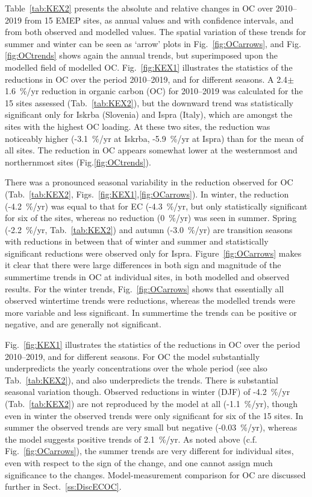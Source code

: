  Table~\ref{tab:KEX2} presents the absolute and relative changes in OC over 2010--2019 from 15 EMEP sites, as annual values and with confidence intervals, and from both observed and modelled values. The spatial variation of these trends for summer and winter can be seen as `arrow' plots in Fig.~\ref{fig:OCarrows}, and Fig.\ref{fig:OCtrends} shows again the annual trends, but superimposed upon the modelled field of modelled OC.
Fig.~\ref{fig:KEX1} illustrates the statistics of the reductions in OC  over the period 2010--2019, and for different seasons. 
A 2.4$\pm$1.6~\%/yr reduction
  in organic carbon (OC) for 2010--2019
was calculated for the 15 sites assessed (Tab.~\ref{tab:KEX2}), but the
downward trend was statistically significant only for Iskrba (Slovenia)
and Ispra (Italy), which are amongst the sites with the highest OC
loading. At these two sites, the reduction was noticeably higher 
(-3.1~\%/yr at Iskrba, -5.9~\%/yr at Ispra) than for the mean of all sites. The
reduction in OC appears somewhat lower at the westernmost and northernmost
sites (Fig.\ref{fig:OCtrends}). 




There was a pronounced seasonal variability in the reduction observed for
OC (Tab.~\ref{tab:KEX2}, Figs.~\ref{fig:KEX1},\ref{fig:OCarrows}). In winter, the
 reduction (-4.2~\%/yr) was equal to that for
EC (-4.3~\%/yr, but only statistically significant for six of the sites,
whereas no reduction (0~\%/yr) was seen in summer. Spring (-2.2~\%/yr, Tab.~\ref{tab:KEX2}) and autumn (-3.0~\%/yr) are transition seasons with reductions in between
that of winter and summer and statistically significant reductions were
observed only for Ispra. 
%
Figure~\ref{fig:OCarrows} makes it clear that there were large differences in both sign and magnitude of the summertime trends in OC at individual sites, in both modelled and observed results. For the winter trends, Fig.~\ref{fig:OCarrows} shows that essentially all observed wintertime trends were reductions, whereas the modelled trends were more variable and less significant. In summertime the trends can be positive or negative, and are generally not significant.


Fig.~\ref{fig:KEX1} illustrates the statistics of the reductions in OC  over the period 2010--2019, and for different seasons. For OC the model substantially underpredicts the yearly concentrations over the whole period (see also Tab.~\ref{tab:KEX2}), and also underpredicts the trends. There is substantial seasonal variation though. Observed reductions in winter (DJF) of -4.2~\%/yr (Tab.~\ref{tab:KEX2}) are not reproduced by the model at all (-1.1~\%/yr), though even in winter the observed trends were only significant for six of the 15 sites. In summer the observed trends are very small but negative (-0.03~\%/yr), whereas the model suggests positive trends of 2.1~\%/yr. As noted above (c.f. Fig.~\ref{fig:OCarrows}), the summer trends are very different for individual sites, even with respect to the sign of the change, and one cannot assign much significance to the changes. Model-measurement comparison for OC are discussed further in Sect.~\ref{ss:DiscECOC}.






